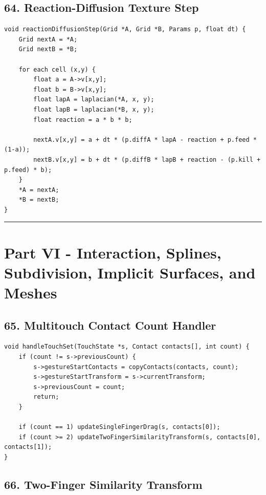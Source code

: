 \documentclass[10pt,letterpaper]{article}
\begin{document}
\subsection{64. Reaction-Diffusion Texture Step}

\begin{verbatim}
void reactionDiffusionStep(Grid *A, Grid *B, Params p, float dt) {
    Grid nextA = *A;
    Grid nextB = *B;

    for each cell (x,y) {
        float a = A->v[x,y];
        float b = B->v[x,y];
        float lapA = laplacian(*A, x, y);
        float lapB = laplacian(*B, x, y);
        float reaction = a * b * b;

        nextA.v[x,y] = a + dt * (p.diffA * lapA - reaction + p.feed * (1-a));
        nextB.v[x,y] = b + dt * (p.diffB * lapB + reaction - (p.kill + p.feed) * b);
    }
    *A = nextA;
    *B = nextB;
}
\end{verbatim}

\medskip\hrule\medskip

\clearpage
\section{Part VI - Interaction, Splines, Subdivision, Implicit Surfaces, and Meshes}

\subsection{65. Multitouch Contact Count Handler}

\begin{verbatim}
void handleTouchSet(TouchState *s, Contact contacts[], int count) {
    if (count != s->previousCount) {
        s->gestureStartContacts = copyContacts(contacts, count);
        s->gestureStartTransform = s->currentTransform;
        s->previousCount = count;
        return;
    }

    if (count == 1) updateSingleFingerDrag(s, contacts[0]);
    if (count >= 2) updateTwoFingerSimilarityTransform(s, contacts[0], contacts[1]);
}
\end{verbatim}

\subsection{66. Two-Finger Similarity Transform}
\end{document}
